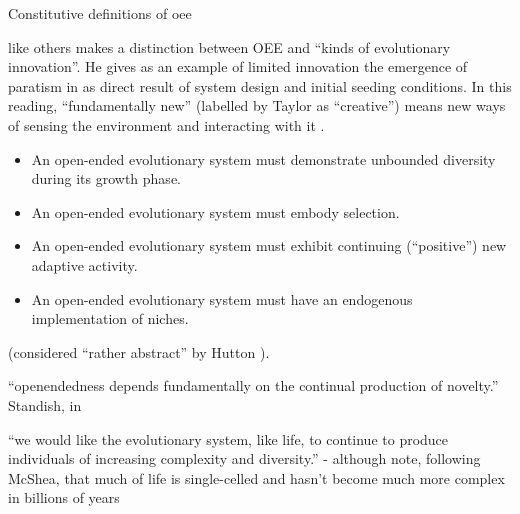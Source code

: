 Constitutive definitions of \gls{oee}

\parencite{Taylor2001} like others makes a distinction between OEE and ``kinds of evolutionary innovation''. He gives as an example of limited innovation the emergence of paratism in \cite{Ray1991} as direct result of system design and initial seeding conditions. In this reading, ``fundamentally new'' (labelled by Taylor as ``creative'') means new ways of sensing the environment and interacting with it \cite{Taylor2001}.


\begin{itemize}
	\item An open-ended evolutionary system must demonstrate unbounded diversity during its growth phase.
	\item An open-ended evolutionary system must embody selection.
	\item An open-ended evolutionary system must exhibit continuing (``positive'') new adaptive activity.
	\item An open-ended evolutionary system must have an endogenous implementation of niches.
\end{itemize} \cite{Maley1999} (considered ``rather abstract'' by Hutton \parencite[p.341]{Hutton2002}).

``openendedness depends fundamentally on the continual production of novelty.'' Standish, in \parencite{Soros2014}

``we would like the evolutionary system, like life, to continue to produce individuals of increasing complexity and diversity.'' -
although note, following McShea, that much of life is single-celled and hasn't become much more complex in billions of years \parencite{Maley1999}



